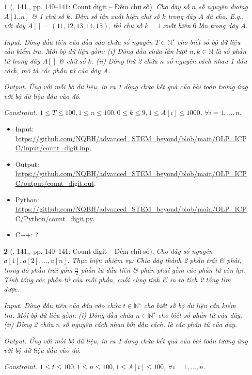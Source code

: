 \documentclass{article}
\newtheorem{baitoan}{}
\begin{document}
\begin{baitoan}[\cite{Duc_200_BT_Python}, 141., pp. 140--141: Count digit -- Đếm chữ số]
	Cho dãy số $n$ số nguyên dương $A[1..n]$ \& 1 chữ số $k$. Đếm số lần xuất hiện chữ số $k$ trong dãy $A$ đã cho. E.g., với dãy $A[] = (11,12,13,14,15)$, thì chữ số $k = 1$ xuất hiện $6$ lần trong dãy $A$.
	\item {\sf Input.} Dòng đầu tiên của đầu vào chứa số nguyên $T\in\mathbb{N}^\star$ cho biết số bộ dữ liệu cần kiểm tra. Mỗi bộ dữ liệu gồm: (i) Dòng đầu chứa lần lượt $n,k\in\mathbb{N}$ là số phần tử trong dãy $A[]$ \& chữ số $k$. (ii) Dòng thứ 2 chứa $n$ số nguyên cách nhau 1 dấu cách, mô tả các phần tử của dãy $A$.
	\item {\sf Output.} Ứng với mỗi bộ dữ liệu, in ra 1 dòng chứa kết quả của bài toán tương ứng với bộ dữ liệu đầu vào đó.
	\item {\sf Constraint.} $1\le T\le100,1\le n\le100,0\le k\le9,1\le A[i]\le1000$, $\forall i = 1,\ldots,n$.
\end{baitoan}

\begin{itemize}
	\item Input: \url{https://github.com/NQBH/advanced_STEM_beyond/blob/main/OLP_ICPC/input/count_digit.inp}.
	\item Output: \url{https://github.com/NQBH/advanced_STEM_beyond/blob/main/OLP_ICPC/output/count_digit.out}.
	\item Python: \url{https://github.com/NQBH/advanced_STEM_beyond/blob/main/OLP_ICPC/Python/count_digit.py}.
	\item C++: ?
\end{itemize}

\begin{baitoan}[\cite{Duc_200_BT_Python}, 141., pp. 140--141: Count digit -- Đếm chữ số]
	Cho dãy số nguyên $a[1],a[2],\ldots,a[n]$. Thực hiện nhiệm vụ: Chia dãy thành 2 phần trái \& phải, trong đó phần trái gồm $\frac{n}{2}$ phần tử đầu tiên \& phần phải gồm các phần tử còn lại. Tính tổng các phần tử của mỗi phần, cuối cùng tính \& in ra tích 2 tổng tìm được.
	\item {\sf Input.} Dòng đầu tiên của đầu vào chứa $t\in\mathbb{N}^\star$ cho biết số bộ dữ liệu cần kiểm tra. Mỗi bộ dữ liệu gồm: (i) Dòng đầu chứa $n\in\mathbb{N}^\star$ cho biết số phần tử của dãy. (ii) Dòng 2 chứa $n$ số nguyên cách nhau bởi dấu cách, là các phần tử của dãy.
	\item {\sf Output.} Ứng với mỗi bộ dữ liệu, in ra 1 dong chứa kết quả của bài toán tương ứng với bộ dữ liệu đầu vào đó.
	\item {\sf Constraint.} $1\le t\le100,1\le n\le100,1\le A[i]\le100$, $\forall i = 1,\ldots,n$.
\end{baitoan}
\end{document}
